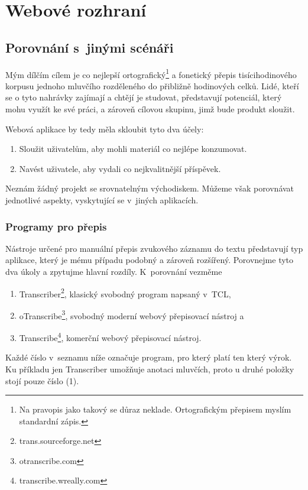 \chapter{Webové rozhraní}
\label{kap:webove-rozhrani}

\section{Porovnání s~jinými scénáři}

Mým dílčím cílem je co nejlepší ortografický\footnote{Na pravopis jako takový se důraz
neklade. Ortografickým přepisem myslím standardní zápis.} a fonetický přepis
tisícihodinového korpusu jednoho mluvčího rozděleného do přibližně hodinových
celků. Lidé, kteří se o tyto nahrávky zajímají a chtějí je studovat, představují
potenciál, který mohu využít ke své práci, a zároveň cílovou skupinu, jimž bude
produkt sloužit.

Webová aplikace by tedy měla skloubit tyto dva účely:
\begin{enumerate}
\item{Sloužit uživatelům, aby mohli  materiál co nejlépe konzumovat.}
\item{Navést uživatele, aby vydali co nejkvalitnější příspěvek.}
\end{enumerate}

Neznám žádný projekt se srovnatelným východiskem. Můžeme
však porovnávat jednotlivé aspekty, vyskytující se v~jiných aplikacích.

\subsection{Programy pro přepis}
\label{ssec:diff:trans}

Nástroje určené pro manuální přepis zvukového záznamu do textu představují
typ aplikace, který je mému případu podobný a zároveň rozšířený.
Porovnejme tyto dva úkoly a zpytujme hlavní rozdíly. K~porovnání
vezměme
\begin{enumerate}
\item{
    Transcriber\footnote{trans.sourceforge.net}, klasický svobodný program
    napsaný v~TCL,
}
\item{
    oTranscribe\footnote{otranscribe.com}, svobodný moderní webový přepisovací
    nástroj a
}
\item{
    Transcribe\footnote{transcribe.wreally.com}, komerční webový přepisovací
    nástroj.
}
\end{enumerate}

Každé číslo v~seznamu níže označuje program, pro který platí ten který výrok. Ku
příkladu jen Transcriber umožňuje anotaci mluvčích, proto u druhé položky
stojí pouze číslo (1).



